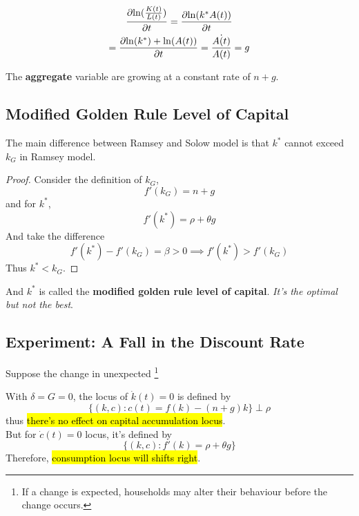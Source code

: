 \documentclass[11pt]{article}
\begin{document}
			\begin{example}
				\begin{gather*}
					\frac{\partial{\ln(\frac{K(t)}{L(t)})}}{\partial{t}} = \frac{\partial{\ln(k^*A(t))}}{\partial{t}} \\
					= \frac{\partial{\ln(k^*) + \ln(A(t))}}{\partial{t}} = \frac{\dot{A(t)}}{A(t)} = g
				\end{gather*}
			\end{example}
			The \textbf{aggregate} variable are growing at a constant rate of $n+g$.
			
		\subsection{Modified Golden Rule Level of Capital}
			\par The main difference between Ramsey and Solow model is that $k^*$ cannot exceed $k_G$ in Ramsey model.
			\begin{proof}
				Consider the definition of $k_G$, 
				\[
					f'(k_G) = n + g
				\]
				and for $k^*$,
				\[
					f'(k^*) = \rho + \theta g
				\]
				And take the difference 
				\[
					f'(k^*) - f'(k_G) = \beta > 0 \implies f'(k^*) > f'(k_G)
				\]
				Thus $k^* < k_G$.
			\end{proof}
			And $k^*$ is called the \textbf{modified golden rule level of capital}. \emph{It's the optimal but not the best}.
		
		\subsection{Experiment: A Fall in the Discount Rate}
			\begin{assumption}
				Suppose the change in unexpected \footnote{If a change is expected, households may alter their behaviour before the change occurs.}
			\end{assumption}
			\begin{remark}
				With $\delta = G = 0$, the locus of $\dot{k}(t) = 0$ is defined by
				\[
					\{(k, c):c(t) = f(k) - (n+g)k\} \perp \rho
				\]
				thus \hl{there's no effect on capital accumulation locus}.\\
				But for $\dot{c}(t)=0$ locus, it's defined by
				\[
					\{(k,c): f'(k) = \rho + \theta g\}
				\]
				Therefore, \hl{consumption locus will shifts right}.
			\end{remark}
\end{document}

